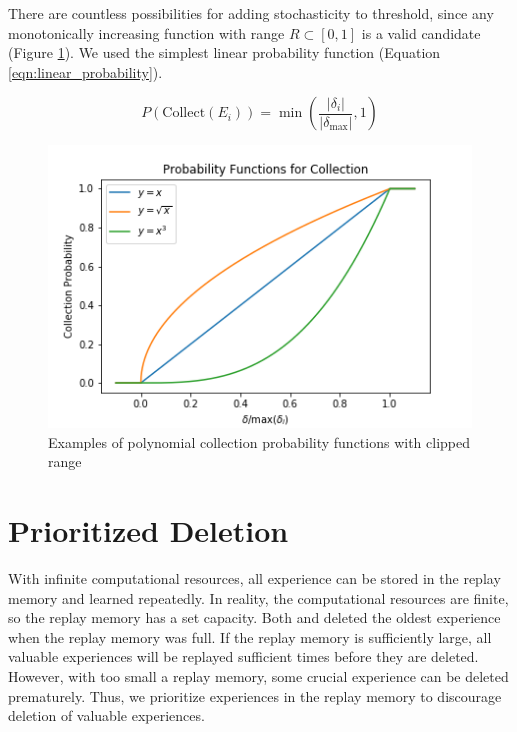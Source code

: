 \documentclass{article} %
\begin{document}
There are countless possibilities for adding stochasticity to threshold, since any monotonically increasing function with range $R \subset [0, 1]$ is a valid candidate (Figure \ref{fig:collection_prob_funcs}). We used the simplest linear probability function (Equation \ref{eqn:linear_probability}).

\begin{equation}
P(\text{Collect}(E_i)) = \min \left( \frac{\lvert \delta_i \rvert}{\lvert \delta_{\text{max}} \rvert}, 1 \right)
\label{eqn:linear_probability}
\end{equation}

\begin{figure}[!ht]
  \centering
  \includegraphics[width=.5\textwidth]{images/ProbabilityFunctions.png}
  \caption{Examples of polynomial collection probability functions with clipped range}
  \label{fig:collection_prob_funcs}
\end{figure}



\section{Prioritized Deletion}
With infinite computational resources, all experience can be stored in the replay memory and learned repeatedly. In reality, the computational resources are finite, so the replay memory has a set capacity. Both \cite{DQN} and \cite{PER} deleted the oldest experience when the replay memory was full. If the replay memory is sufficiently large, all valuable experiences will be replayed sufficient times before they are deleted. However, with too small a replay memory, some crucial experience can be deleted prematurely. Thus, we prioritize experiences in the replay memory to discourage deletion of valuable experiences.
\end{document}
